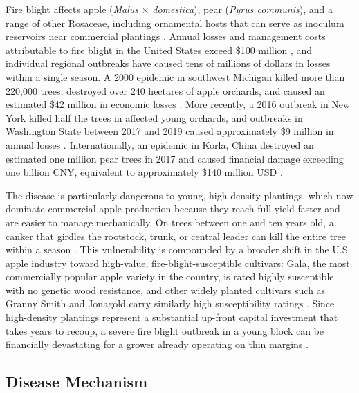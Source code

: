 Fire blight affects apple (\textit{Malus} $\times$ \textit{domestica}), pear
(\textit{Pyrus communis}), and a range of other Rosaceae, including ornamental
hosts that can serve as inoculum reservoirs near commercial plantings
\cite{acimovic2026fireblight}.
Annual losses and management costs attributable to fire blight in the United
States exceed \$100 million \cite{Norelli2003FireBlightManagementTwentyFirst,
acimovic2026fireblight}, and individual regional outbreaks have caused tens of
millions of dollars in losses within a single season.
A 2000 epidemic in southwest Michigan killed more than 220,000 trees, destroyed
over 240 hectares of apple orchards, and caused an estimated \$42 million in
economic losses \cite{Norelli2003FireBlightManagementTwentyFirst}.
More recently, a 2016 outbreak in New York killed half the trees in affected
young orchards, and outbreaks in Washington State between 2017 and 2019 caused
approximately \$9 million in annual losses \cite{acimovic2026fireblight}.
Internationally, an epidemic in Korla, China destroyed an estimated one
million pear trees in 2017 and caused financial damage exceeding one billion
CNY, equivalent to approximately \$140 million USD
\cite{Sun2023CurrentSituationChina, acimovic2026fireblight}.

The disease is particularly dangerous to young, high-density plantings, which
now dominate commercial apple production because they reach full yield faster
and are easier to manage mechanically.
On trees between one and ten years old, a canker that girdles the rootstock,
trunk, or central leader can kill the entire tree within a season
\cite{Acimovic2023RootstockFireBlight, acimovic2026fireblight}.
This vulnerability is compounded by a broader shift in the U.S. apple industry
toward high-value, fire-blight-susceptible cultivars: Gala, the most commercially
popular apple variety in the country, is rated highly susceptible with no
genetic wood resistance, and other widely planted cultivars such as Granny
Smith and Jonagold carry similarly high susceptibility ratings
\cite{gerlach2025usapple, acimovic2026fireblight}.
Since high-density plantings represent a substantial up-front capital
investment that takes years to recoup, a severe fire blight outbreak in a
young block can be financially devastating for a grower already operating on
thin margins \cite{gerlach2025usapple}.

\subsection{Disease Mechanism} \label{secFireBlightMechanism}

